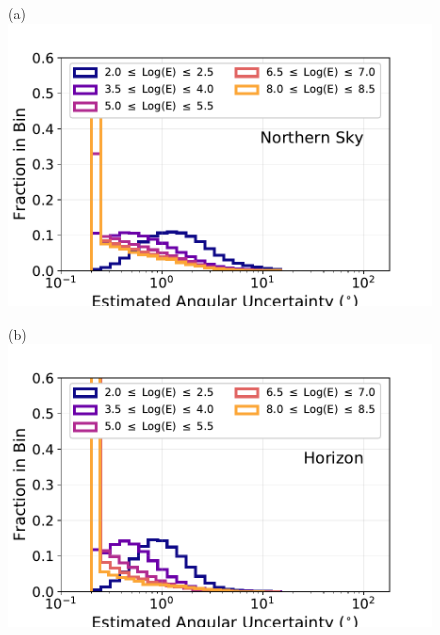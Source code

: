 \documentclass[aps,10pt,prd,twocolumn,floats,letterpaper,showpacs,nofootinbib,bibnotes,notitlepage,superscriptaddress,floatfix]{revtex4-1}
\begin{document}
\begin{figure}[t]\centering
\begin{minipage}[c][3.5cm][c]{0.30\textwidth}\centering
{(a)}\\\includegraphics[width=\linewidth]{./PublicReleasePlots/ReconstructionPlots/IC86-II/IC86_II_MC_angErr_2.pdf}
\end{minipage}
\begin{minipage}[c][3.5cm][c]{0.30\textwidth}\centering
{(b)}\\\includegraphics[width=\linewidth]{./PublicReleasePlots/ReconstructionPlots/IC86-II/IC86_II_MC_angErr_1.pdf}
\end{minipage}
\begin{minipage}[c][3.5cm][c]{0.30\textwidth}\centering

\end{minipage}
\end{figure}
\end{document}
